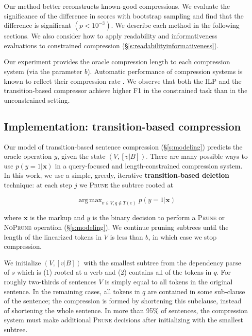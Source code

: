 \documentclass[11pt,a4paper]{article}
\DeclareMathOperator*{\argmaxA}{arg\,max} %
\begin{document}
Our method better reconstructs known-good compressions. We evaluate the significance of the difference in scores with bootstrap sampling  \cite{D12-1091} and find that the difference is significant {\tiny $(p < 10^{-3})$}. We describe each method in the following sections. We also consider how to apply readability and informativeness evaluations to constrained compression (\S\ref{s:readabilityinformativeness}). 

Our experiment provides the oracle compression length to each compression system (via the parameter $b$). Automatic performance of compression systems is known to reflect their compression rate \cite{napoles2011evaluating}. We observe that both the ILP and the transition-based compressor achieve higher F1 in the constrained task than in the unconstrained setting.

\subsection{Implementation: transition-based compression}\label{s:transition}

Our model of transition-based sentence compression (\S\ref{s:modeling}) predicts the oracle operation $y$, given the state $(V,[v|B])$. There are many possible ways to use $p(y=1| \bm{x})$ in a query-focused and length-constrained compression system. In this work, we use a simple, greedy, iterative \textbf{transition-based deletion} technique: at each step $j$ we \textsc{Prune} the subtree rooted at 

$$\argmaxA_{v \in V,q\not\in T(v)}   p(y = 1 | \bm{x})$$

\noindent where $\bm{x}$ is the markup and $y$ is the binary decision to perform a \textsc{Prune} or \textsc{NoPrune} operation (\S\ref{s:modeling}). We continue pruning subtrees until the length of the linearized tokens in $V$ is less than $b$, in which case we stop compression. 

We initialize $(V, [v|B])$ with the smallest subtree from the dependency parse of $s$ which is (1) rooted at a verb and (2) contains all of the tokens in $q$. For roughly two-thirds of sentences $V$ is simply equal to all tokens in the original sentence. In the remaining cases, all tokens in $q$ are contained in some sub-clause of the sentence; the compression is formed by shortening this subclause, instead of shortening the whole sentence. In more than 95\% of sentences, the compression system must make additional \textsc{Prune} decisions after initializing with the smallest subtree.
\end{document}
